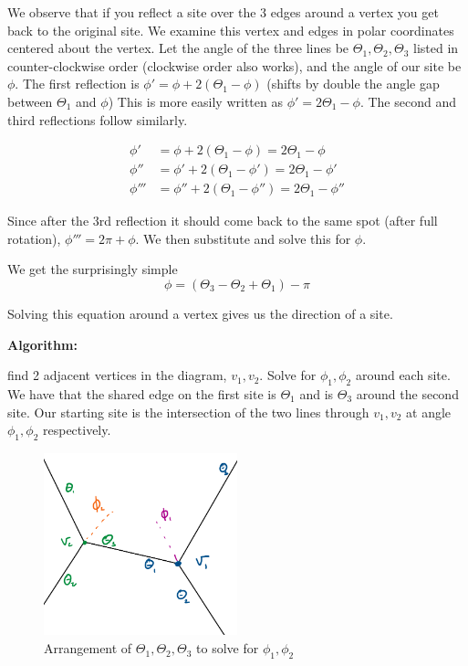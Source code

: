 \documentclass[11pt]{article}
\begin{document}
We observe that if you reflect a site over the 3 edges around a vertex you get back to the original site.
We examine this vertex and edges in polar coordinates centered about the vertex.
Let the angle of the three lines be $\Theta_1, \Theta_2, \Theta_3$ listed in counter-clockwise order (clockwise order also works),
 and the angle of our site be $\phi$.
The first reflection is $\phi ' = \phi + 2(\Theta_1 - \phi)$ (shifts by double the angle gap between $\Theta_1$ and $\phi$)
This is more easily written as $\phi' = 2\Theta_1 - \phi$.
The second and third reflections follow similarly.

\begin{align}
    \phi ' &= \phi + 2(\Theta_1 - \phi) = 2\Theta_1 - \phi \\
    \phi '' &= \phi' + 2(\Theta_1 - \phi') = 2\Theta_1 - \phi'\\ 
    \phi ''' &= \phi'' + 2(\Theta_1 - \phi'') = 2\Theta_1 - \phi''
\end{align}

Since after the 3rd reflection it should come back to the same spot (after full rotation),
$\phi ''' = 2\pi + \phi$. We then substitute and solve this for $\phi$.

We get the surprisingly simple 
\begin{equation}
    \phi = (\Theta_3 - \Theta_2 + \Theta_1) - \pi
\end{equation}

Solving this equation around a vertex gives us the direction of a site. 

\textbf{Algorithm: }

find 2 adjacent vertices in the diagram, $v_1, v_2$. Solve for $\phi_1, \phi_2$ around each site.
We have that the shared edge on the first site is $\Theta_1$ and is $\Theta_3$ around the second site.
Our starting site is the intersection of the two lines through $v_1, v_2$ at angle $\phi_1, \phi_2$ 
respectively. 

\begin{figure}[h]
    \centering
    \includegraphics[width = 0.5\textwidth]{phi.png}
    \caption{Arrangement of $\Theta_1, \Theta_2, \Theta_3$ to solve for $\phi_1, \phi_2$}
\end{figure}
\end{document}

